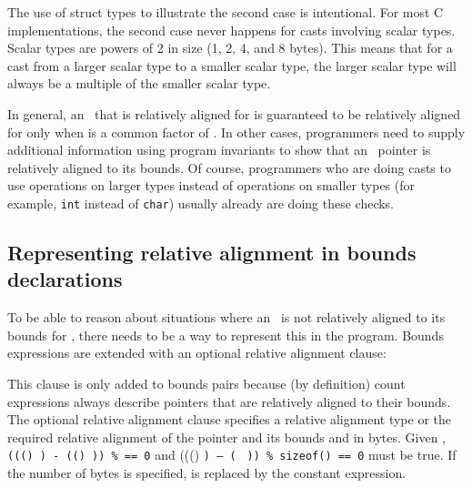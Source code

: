 The use of struct types to illustrate the second case is intentional.
For most C implementations, the second case never happens for casts
involving scalar types. Scalar types are powers of 2 in size (1, 2, 4,
and 8 bytes). This means that for a cast from a larger scalar type to a
smaller scalar type, the larger scalar type will always be a multiple of
the smaller scalar type.

In general, an
\arrayptrT\ that is
relatively aligned for  is guaranteed to be relatively aligned
for  only
when  is a common factor of
. In other cases, programmers need to
supply additional information using program invariants to show that an
\arrayptr\ pointer is relatively aligned to its bounds. Of
course, programmers who are doing casts to use operations on larger
types instead of operations on smaller types (for example, \texttt{int}
instead of \texttt{char}) usually already are doing these checks.

\subsection{Representing relative alignment in bounds declarations}
\label{section:pointer-cast-results}

To be able to reason about situations where an
\arrayptrT\ is not
relatively aligned to its bounds for , there needs to be a way
to represent this in the program. Bounds expressions are extended with
an optional relative alignment clause:


\var{\ldots{}}

\begin{quote}
\end{quote}


\begin{quote}

\end{quote}

This clause is only added to bounds pairs because (by definition) count
expressions always describe pointers that are relatively aligned to
their bounds. The optional relative alignment clause specifies a
relative alignment type  or the required relative alignment of
the pointer and its bounds and in bytes. Given 
,
\texttt{(((\arrayptrchar) ) - ((\arrayptrchar) )) \%
         == 0} and
(((\arrayptrchar) \texttt{) --
(\arrayptrchar\ } \texttt{)) \%
sizeof(}\texttt{) == 0} must be true. If the number of bytes is
specified,  is replaced by the
constant expression.

